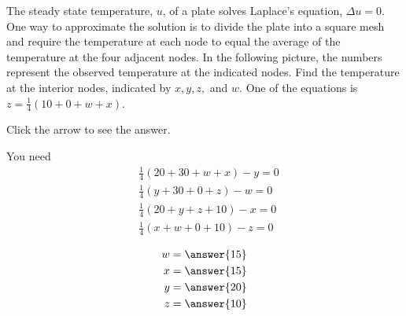 \documentclass{ximera}
\begin{document}
\begin{problem}\label{prb:2.43} The steady state temperature, $u$, of a plate solves Laplace's
equation, $\Delta u=0.$ One way to approximate the solution is to divide the plate into a square mesh and require the temperature
at each node to equal the average of the temperature at the four adjacent
nodes. In the following picture, the numbers represent the observed
temperature at the indicated nodes. Find the temperature at
the interior nodes, indicated by $x,y,z,$ and $w$. One of the equations is
$z=\frac{1}{4}\left( 10+0+w+x\right) $.

\begin{center}
\end{center}

Click the arrow to see the answer. 
\begin{expandable}
You need 
\begin{align*}
&\frac{1}{4}\left( 20+30+w+x\right) -y=0 \\
&\frac{1}{4}\left( y+30+0+z\right) -w=0 \\
&\frac{1}{4}\left( 20+y+z+10\right) -x=0 \\
&\frac{1}{4}\left( x+w+0+10\right) -z=0
\end{align*}
\end{expandable}
 \begin{align*}
 w&=\answer{15}\\
 x&=\answer{15}\\
 y&=\answer{20}\\
 z&=\answer{10}\\
 \end{align*}
\end{problem}
\end{document}
